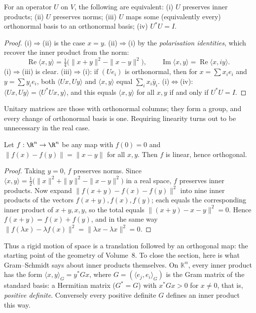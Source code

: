 \begin{theorem}\label{linear:thm:unitary}
For an operator $U$ on $V$, the following are equivalent: (i) $U$ preserves inner products; (ii) $U$ preserves norms;
(iii) $U$ maps some (equivalently every) orthonormal basis to an orthonormal basis; (iv) $U^*U=I$.
\end{theorem}
\begin{proof}
(i)$\Rightarrow$(ii) is the case $x=y$. (ii)$\Rightarrow$(i) by the \emph{polarisation identities}, which recover the inner
product from the norm:
\[
\operatorname{Re}\langle x,y\rangle=\tfrac14\bigl(\|x+y\|^2-\|x-y\|^2\bigr),\qquad \operatorname{Im}\langle x,y\rangle=
\operatorname{Re}\langle x,iy\rangle.
\]
(i)$\Rightarrow$(iii) is clear. (iii)$\Rightarrow$(i): if $(Ue_i)$ is orthonormal, then for $x=\sum x_ie_i$ and $y=\sum
y_ie_i$, both $\langle Ux,Uy\rangle$ and $\langle x,y\rangle$ equal $\sum_ix_i\bar y_i$. (i)$\Leftrightarrow$(iv):
$\langle Ux,Uy\rangle=\langle U^*Ux,y\rangle$, and this equals $\langle x,y\rangle$ for all $x,y$ if and only if $U^*U=I$.
\end{proof}

Unitary matrices are those with orthonormal columns; they form a group, and every change of orthonormal basis is one.
Requiring linearity turns out to be unnecessary in the real case.

\begin{theorem}\label{linear:thm:isometry}
Let $f:\R^n\to\R^n$ be any map with $f(0)=0$ and $\|f(x)-f(y)\|=\|x-y\|$ for all $x,y$. Then $f$ is linear, hence
orthogonal.
\end{theorem}
\begin{proof}
Taking $y=0$, $f$ preserves norms. Since $\langle x,y\rangle=\frac12\bigl(\|x\|^2+\|y\|^2-\|x-y\|^2\bigr)$ in a real space,
$f$ preserves inner products. Now expand $\|f(x+y)-f(x)-f(y)\|^2$ into nine inner products of the vectors
$f(x+y),f(x),f(y)$; each equals the corresponding inner product of $x+y,x,y$, so the total equals
$\|(x+y)-x-y\|^2=0$. Hence $f(x+y)=f(x)+f(y)$, and in the same way $\|f(\lambda x)-\lambda f(x)\|^2=\|\lambda x-\lambda
x\|^2=0$.
\end{proof}

Thus a rigid motion of space is a translation followed by an orthogonal map: the starting point of the geometry of
Volume~8. To close the section, here is what Gram--Schmidt says about inner products themselves. On $\mathbb K^n$, every
inner product has the form $\langle x,y\rangle_G=y^*Gx$, where $G=(\langle e_j,e_i\rangle_G)$ is the Gram matrix of the
standard basis: a Hermitian matrix ($G^*=G$) with $x^*Gx>0$ for $x\ne0$, that is, \emph{positive definite}. Conversely
every positive definite $G$ defines an inner product this way.

